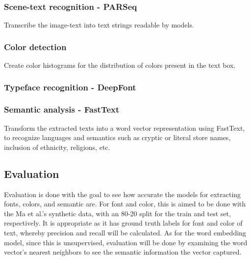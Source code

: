 \subsubsection{Scene-text recognition - PARSeq}
Transcribe the image-text into text strings readable by models.

\subsubsection{Color detection}
Create color histograms for the distribution of colors present in the text box.

\subsubsection{Typeface recognition - DeepFont} 

\subsubsection{Semantic analysis - FastText}
Transform the extracted texts into a word vector representation using FastText, to recognize languages and semantics such as cryptic or literal store names, inclusion of ethnicity, religions, etc.

\subsection{Evaluation}
Evaluation is done with the goal to see how accurate the models for extracting fonts, colors, and semantic are. For font and color, this is aimed to be done with the Ma et al.'s synthetic data, with an 80-20 split for the train and test set, respectively. It is appropriate as it has ground truth labels for font and color of text, whereby precision and recall will be calculated. As for the word embedding model, since this is unsupervised, evaluation will be done by examining the word vector's nearest neighbors to see the semantic information the vector captured.
